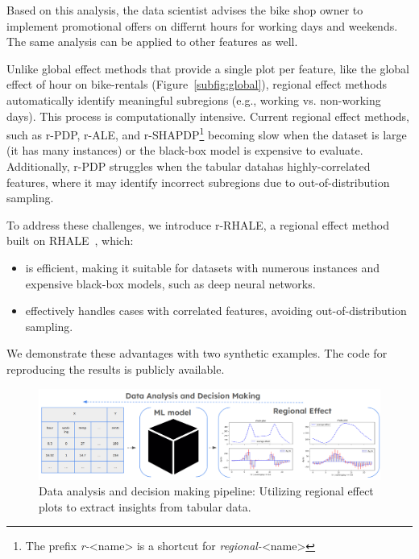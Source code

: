 \documentclass[
twocolumn,
]{ceurart}
\begin{document}
Based on this analysis, the data scientist advises the bike shop owner to implement promotional offers on differnt hours for working days and weekends. The same analysis can be applied to other features as well.

Unlike global effect methods that provide a single plot per feature, like the global effect of hour on bike-rentals (Figure~\ref{subfig:global}), regional effect methods automatically identify meaningful subregions (e.g., working vs. non-working days). This process is computationally intensive. Current regional effect methods, such as r-PDP, r-ALE, and r-SHAPDP\footnote{The prefix \textit{r-}<name> is a shortcut for \textit{regional-}<name>} becoming slow when the dataset is large (it has many instances) or the black-box model is expensive to evaluate. Additionally, r-PDP struggles when the tabular datahas highly-correlated features, where it may identify incorrect subregions due to out-of-distribution sampling.

To address these challenges, we introduce r-RHALE, a regional effect method built on RHALE~\cite{gkolemis2023rhale, gkolemis22a}, which:

\begin{itemize}
\item is efficient, making it suitable for datasets with numerous instances and expensive black-box models, such as deep neural networks.
\item effectively handles cases with correlated features, avoiding out-of-distribution sampling.
\end{itemize}

We demonstrate these advantages with two synthetic examples. The code for reproducing the results is publicly available.

\begin{figure}[t]
    \centering
    \includegraphics[width=\textwidth]{figures/concept_image.png}
    \caption{Data analysis and decision making pipeline: Utilizing regional effect plots to extract insights from tabular data.}
    \label{fig:concept_figure}
\end{figure}
\end{document}
